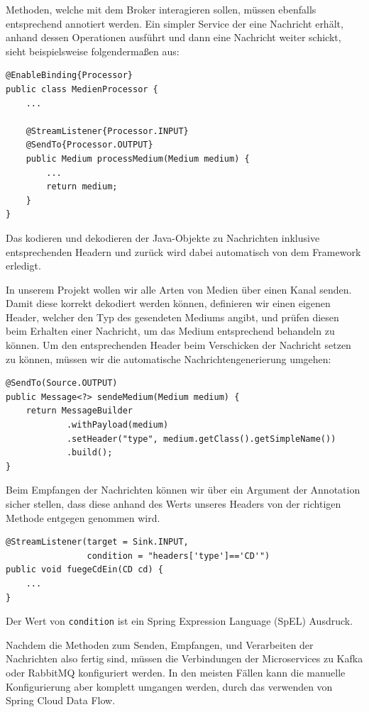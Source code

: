 \documentclass{article}
\begin{document}
Methoden, welche mit dem Broker interagieren sollen, müssen ebenfalls entsprechend annotiert werden.
Ein simpler Service der eine Nachricht erhält, anhand dessen Operationen ausführt und dann eine Nachricht weiter schickt, sieht beispielsweise folgendermaßen aus:
\begin{lstlisting}
@EnableBinding{Processor}
public class MedienProcessor {
    ...

    @StreamListener{Processor.INPUT}
    @SendTo{Processor.OUTPUT}
    public Medium processMedium(Medium medium) {
        ...
        return medium;
    }
}
\end{lstlisting}

Das kodieren und dekodieren der Java-Objekte zu Nachrichten inklusive entsprechenden Headern und zurück wird dabei automatisch von dem Framework erledigt.

In unserem Projekt wollen wir alle Arten von Medien über einen Kanal senden.
Damit diese korrekt dekodiert werden können, definieren wir einen eigenen Header, welcher den Typ des gesendeten Mediums angibt, und prüfen diesen beim Erhalten einer Nachricht, um das Medium entsprechend behandeln zu können.
Um den entsprechenden Header beim Verschicken der Nachricht setzen zu können, müssen wir die automatische Nachrichtengenerierung umgehen:
\begin{lstlisting}
@SendTo(Source.OUTPUT)
public Message<?> sendeMedium(Medium medium) {
    return MessageBuilder
            .withPayload(medium)
            .setHeader("type", medium.getClass().getSimpleName())
            .build();
}
\end{lstlisting}

Beim Empfangen der Nachrichten können wir über ein Argument der Annotation sicher stellen, dass diese anhand des Werts unseres Headers von der richtigen Methode entgegen genommen wird.
\begin{lstlisting}
@StreamListener(target = Sink.INPUT,
                condition = "headers['type']=='CD'")
public void fuegeCdEin(CD cd) {
    ...
}
\end{lstlisting}

Der Wert von \texttt{condition} ist ein Spring Expression Language (SpEL) Ausdruck.

Nachdem die Methoden zum Senden, Empfangen, und Verarbeiten der Nachrichten also fertig sind, müssen die Verbindungen der Microservices zu Kafka oder RabbitMQ konfiguriert werden.
In den meisten Fällen kann die manuelle Konfigurierung aber komplett umgangen werden, durch das verwenden von Spring Cloud Data Flow.
\end{document}
